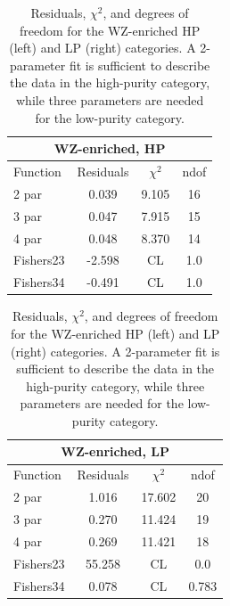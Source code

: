 \begin{table}[h!]
\centering
\begin{tabular}{|l c c c |}
\hline
\multicolumn{4}{|c|}{WZ-enriched, HP}\\
\hline
Function & Residuals & $\chi^2$ & ndof \\
\hline
2 par & 0.039 & 9.105 & 16 \\
3 par & 0.047 & 7.915 & 15 \\
4 par & 0.048 & 8.370 & 14 \\
\hline
\hline
Fishers23 & -2.598& CL & 1.0\\
Fishers34 & -0.491& CL & 1.0\\
\hline
\end{tabular}
\quad
\begin{tabular}{|l c c c |}
\hline
\multicolumn{4}{|c|}{WZ-enriched, LP}\\
\hline
Function & Residuals & $\chi^2$ & ndof \\
\hline
2 par & 1.016 & 17.602 & 20 \\
3 par & 0.270 & 11.424 & 19 \\
4 par & 0.269 & 11.421 & 18 \\
\hline
\hline
Fishers23 & 55.258& CL & 0.0\\
Fishers34 & 0.078& CL & 0.783\\
\hline
\end{tabular}
\caption{Residuals, $\chi^{2}$, and degrees of freedom for the WZ-enriched HP (left) and LP (right) categories. A 2-parameter fit is sufficient to describe the data in the high-purity category, while three parameters are needed for the low-purity category.}
\label{tab:WZ_enriched}
\end{table}
